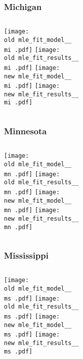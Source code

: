 \documentclass{beamer}
\newcommand{\old}{api-370-prod/pyseir/state_summaries/reports/}
\newcommand{\new}{new/pyseir/state_summaries/reports/}
\newcommand{\mi}{Michigan__26}
\newcommand{\mn}{Minnesota__27}
\newcommand{\ms}{Mississippi__28}
\begin{document}
\begin{frame}
\frametitle{Michigan}
    \begin{columns}[t]

       \texttt{[image: \\old mle\_fit\_model\_\_\\mi .pdf]}
       \texttt{[image: \\old mle\_fit\_results\_\_\\mi .pdf]}   
       \texttt{[image: \\new mle\_fit\_model\_\_\\mi .pdf]}
       \texttt{[image: \\new mle\_fit\_results\_\_\\mi .pdf]}   
\end{columns}
\end{frame}

\begin{frame}
\frametitle{Minnesota}
    \begin{columns}[t]

       \texttt{[image: \\old mle\_fit\_model\_\_\\mn .pdf]}
       \texttt{[image: \\old mle\_fit\_results\_\_\\mn .pdf]}   
       \texttt{[image: \\new mle\_fit\_model\_\_\\mn .pdf]}
       \texttt{[image: \\new mle\_fit\_results\_\_\\mn .pdf]}   
\end{columns}
\end{frame}

\begin{frame}
\frametitle{Mississippi}
    \begin{columns}[t]

       \texttt{[image: \\old mle\_fit\_model\_\_\\ms .pdf]}
       \texttt{[image: \\old mle\_fit\_results\_\_\\ms .pdf]}   
       \texttt{[image: \\new mle\_fit\_model\_\_\\ms .pdf]}
       \texttt{[image: \\new mle\_fit\_results\_\_\\ms .pdf]}   
\end{columns}
\end{frame}
\end{document}
